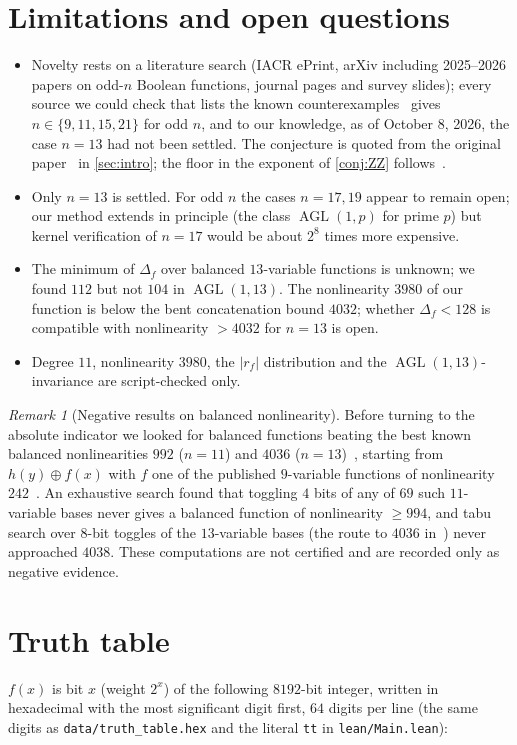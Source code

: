 \documentclass[11pt]{article}
\numberwithin{equation}{section}
\theoremstyle{definition}
\theoremstyle{remark}
\newtheorem{remark}[theorem]{Remark}
\DeclareMathOperator{\AGL}{AGL}
\begin{document}
\section{Limitations and open questions}\label{sec:limits}
\begin{itemize}
\item Novelty rests on a literature search (IACR ePrint, arXiv including 2025--2026 papers on odd-$n$
Boolean functions, journal pages and survey slides); every source we could check that lists the known
counterexamples~\cite{TM16,Tang18,CKW19} gives $n\in\{9,11,15,21\}$ for odd $n$, and to our knowledge, as
of October 8, 2026, the case $n=13$ had not been settled. The conjecture is quoted from the original
paper~\cite{ZZ95} in \cref{sec:intro}; the floor in the exponent of \cref{conj:ZZ} follows~\cite{TM16}.
\item Only $n=13$ is settled. For odd $n$ the cases $n=17,19$ appear to remain open; our method extends
in principle (the class $\AGL(1,p)$ for prime $p$) but kernel verification of $n=17$ would be about
$2^8$ times more expensive.
\item The minimum of $\Delta_f$ over balanced $13$-variable functions is unknown; we found $112$ but not
$104$ in $\AGL(1,13)$. The nonlinearity $3980$ of our function is below the bent concatenation bound
$4032$; whether $\Delta_f<128$ is compatible with nonlinearity $>4032$ for $n=13$ is open.
\item Degree $11$, nonlinearity $3980$, the $|r_f|$ distribution and the $\AGL(1,13)$-invariance are
script-checked only.
\end{itemize}

\begin{remark}[Negative results on balanced nonlinearity]
Before turning to the absolute indicator we looked for balanced functions beating the best known
balanced nonlinearities $992$ ($n=11$) and $4036$ ($n=13$)~\cite{KY07,Mai07,CDJMP22}, starting from
$h(y)\oplus f(x)$ with $f$ one of the published $9$-variable functions of nonlinearity $242$~\cite{KY10}.
An exhaustive search found that toggling $4$ bits of any of $69$ such $11$-variable bases never gives a
balanced function of nonlinearity $\ge994$, and tabu search over $8$-bit toggles of the $13$-variable
bases (the route to $4036$ in~\cite{KY07}) never approached $4038$. These computations are not certified
and are recorded only as negative evidence.
\end{remark}

\appendix
\section{Truth table}\label{app:hex}
$f(x)$ is bit $x$ (weight $2^x$) of the following $8192$-bit integer, written in hexadecimal with the most
significant digit first, $64$ digits per line (the same digits as \texttt{data/truth\_table.hex} and the
literal \texttt{tt} in \texttt{lean/Main.lean}):
{\small

}
\end{document}

